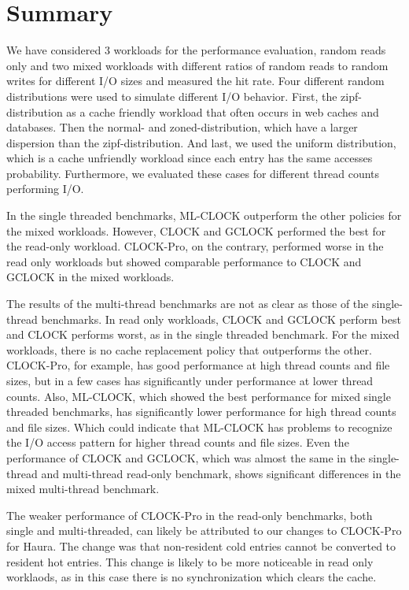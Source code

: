 \documentclass[
	12pt,
	a4paper,
	abstract,
	bibliography=totoc,
	chapterprefix,
	headings=openright,
	numbers=endperiod,
	parskip=half,
	twoside,
]{scrreprt}
\begin{document}
\section{Summary}

We have considered 3 workloads for the performance evaluation,
random reads only and two mixed workloads with different ratios of random reads to random writes for different I/O sizes
and measured the hit rate.
Four different random distributions were used to simulate different I/O behavior.
First, the zipf-distribution as a cache friendly workload that often occurs in web caches and databases.
Then the normal- and zoned-distribution, which have a larger dispersion than the zipf-distribution.
And last, we used the uniform distribution, which is a cache unfriendly workload since each entry
has the same accesses probability.
Furthermore, we evaluated these cases for different thread counts performing I/O.

In the single threaded benchmarks, ML-CLOCK outperform the other policies for the mixed workloads.
However, CLOCK and GCLOCK performed the best for the read-only workload.
CLOCK-Pro, on the contrary, performed worse in the read only workloads 
but showed comparable performance to CLOCK and GCLOCK in the mixed workloads.

The results of the multi-thread benchmarks are not as clear as those of the single-thread benchmarks.
In read only workloads, CLOCK and GCLOCK perform best and CLOCK performs worst, as in the single threaded benchmark.
For the mixed workloads, there is no cache replacement policy that outperforms the other.
CLOCK-Pro, for example, has good performance at high thread counts and file sizes, but in a few cases has significantly 
under performance at lower thread counts.
Also, ML-CLOCK, which showed the best performance for mixed single threaded benchmarks, has 
significantly lower performance for high thread counts and file sizes.
Which could indicate that ML-CLOCK has problems to recognize the I/O access pattern for higher thread counts and file sizes.
Even the performance of CLOCK and GCLOCK, which was almost the same in the single-thread and multi-thread read-only benchmark, shows significant 
differences in the mixed multi-thread benchmark.

The weaker performance of CLOCK-Pro in the read-only benchmarks, both single and multi-threaded, 
can likely be attributed to our changes to CLOCK-Pro for Haura.
The change was that non-resident cold entries cannot be converted to resident hot entries.
This change is likely to be more noticeable in read only worklaods, as in this case there is no synchronization
which clears the cache.
\end{document}
